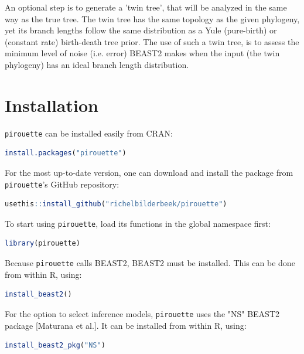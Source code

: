 \documentclass{article}
\begin{document}
An optional step is to generate a 'twin tree', that will be
analyzed in the same way as the true tree. The twin tree has the same
topology as the given phylogeny, yet its branch lengths follow the same
distribution as a Yule (pure-birth) or (constant rate) birth-death tree prior.
The use of such a twin tree, is to assess the minimum level of noise (i.e. 
error) BEAST2 makes when the input (the twin phylogeny) has an ideal branch
length distribution.

\section{Installation}

\verb;pirouette; can be installed easily from CRAN:

\begin{lstlisting}[language=R, floatplacement=H]
install.packages("pirouette")
\end{lstlisting}

For the most up-to-date version, 
one can download and install the package from \verb;pirouette;'s GitHub repository:

\begin{lstlisting}[language=R, floatplacement=H]
usethis::install_github("richelbilderbeek/pirouette")
\end{lstlisting}

To start using \verb;pirouette;, load its functions in the global namespace first:

\begin{lstlisting}[language=R, floatplacement=H]
library(pirouette)
\end{lstlisting}
Because \verb;pirouette; calls BEAST2, BEAST2 must be installed. 
This can be done from within R, using:

\begin{lstlisting}[language=R, floatplacement=H]
install_beast2()
\end{lstlisting}
For the option to select inference models,
\verb;pirouette; uses the "NS" BEAST2 package [Maturana et al.].
It can be installed from within R, using:

\begin{lstlisting}[language=R, floatplacement=H]
install_beast2_pkg("NS")
\end{lstlisting}
\end{document}
